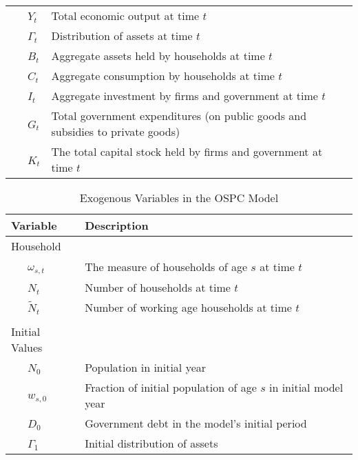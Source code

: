 \documentclass[letterpaper,12pt]{article}
\theoremstyle{definition}
\begin{document}
\begin{table}[h!]
\begin{tabular}{ll}
    \ \ \ $Y_{t}$ & Total economic output at time $t$ \\
    \ \ \ $\Gamma_{t}$ & Distribution of assets at time $t$ \\
    \ \ \ $B_{t}$ & Aggregate assets held by households at time $t$ \\
    \ \ \ $C_{t}$ & Aggregate consumption by households at time $t$ \\
    \ \ \ $I_{t}$ & Aggregate investment by firms and government at time $t$ \\
    \ \ \ $G_{t}$ & Total government expenditures (on public goods and subsidies to private goods) \\
    \ \ \ $K_{t}$ & The total capital stock held by firms and government at time $t$ \\
    \hline
    \hline
    \end{tabular}%
  \label{tab:addlabel}%
\end{table}%


\begin{table}[h!]
  \centering
  \caption{Exogenous Variables in the OSPC Model}
    \begin{tabular}{ll}
    \hline
    \hline
    Variable & Description \\
    \hline
    Household &  \\
    \ \ \ $\omega_{s,t}$ & The measure of households of age $s$ at time $t$ \\
    \ \ \ $N_{t}$ & Number of households at time $t$ \\
    \ \ \ $\tilde{N}_{t}$ & Number of working age households at time $t$ \\
          &  \\
    Initial Values &  \\
    \ \ \ $N_{0}$ & Population in initial year \\
    \ \ \ $w_{s,0}$ & Fraction of initial population of age $s$ in initial model year \\
    \ \ \ $D_{0}$ & Government debt in the model's initial period \\
    \ \ \ $\Gamma_{1}$ & Initial distribution of assets \\
    \hline
    \hline
    \end{tabular}%
  \label{tab:addlabel}%
\end{table}%
\end{document}

